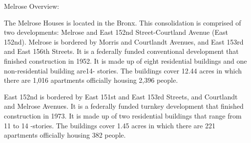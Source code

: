 Melrose Overview: 



The Melrose Houses is located in the Bronx. This consolidation is comprised of two developments: Melrose and East 152nd Street-Courtland Avenue (East 152nd). Melrose is bordered by Morris and Courtlandt Avenues, and East 153rd and East 156th Streets. It is a federally funded conventional development that finished construction in 1952. It is made up of eight residential buildings and one non-residential building are14- stories. The buildings cover 12.44 acres in which there are 1,016 apartments officially housing 2,396 people. 



East 152nd is bordered by East 151st and East 153rd Streets, and Courtlandt and Melrose Avenues. It is a federally funded turnkey development that finished construction in 1973. It is made up of two residential buildings that range from 11 to 14 -stories. The buildings cover 1.45 acres in which there are 221 apartments officially housing 382 people.